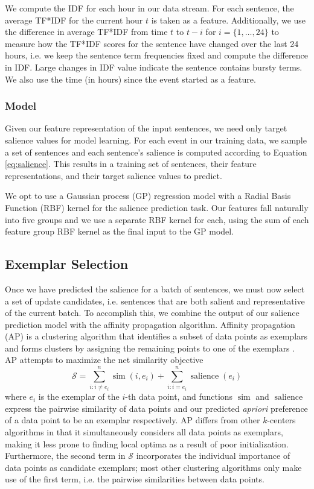 We compute the IDF for each hour in our data stream. For each sentence, the 
average TF*IDF for the current hour $t$ is taken as a feature. Additionally, 
we use the difference in average TF*IDF from time $t$ to $t-i$ for 
$i = \{1, \ldots, 24\}$ to measure how the TF*IDF scores for the sentence have
changed over the last 24 hours, i.e. we keep the sentence term frequencies 
fixed and compute the difference in IDF. Large changes in IDF value indicate 
the sentence contains bursty terms.
We also use the time (in hours) since the event started as a feature.


\subsubsection{Model}


Given our feature representation of the input sentences, we need only target 
salience values for model learning. For each event in our training data, we 
sample a set of sentences and  each sentence's salience is computed according 
to Equation \ref{eq:salience}. This results in a training set of sentences, 
their feature representations, and their target salience values to predict.


We opt to use a Gaussian process (GP) regression model
\cite{rasmussen:gaussian-process-book} with a Radial Basis Function (RBF) 
kernel for the salience prediction task. Our features fall naturally into 
five groups and we use a separate RBF kernel for each, using the sum of each 
feature group RBF kernel as the final input to the GP model.


\subsection{Exemplar Selection}
\label{sec:exsel}


Once we have predicted the salience for a batch of sentences, we must
now select a set of update candidates, i.e. sentences that are both salient
and representative of the current batch. To accomplish this, we combine the 
output of our salience prediction model with the affinity propagation 
algorithm.
Affinity propagation (AP) is a clustering algorithm
that identifies a subset of data points as exemplars and forms clusters
by assigning the remaining points to one of the exemplars 
\cite{frey2007clustering}. AP attempts to maximize the net similarity 
objective 
\[ \mathcal{S} = \sum_{i : i \neq e_i}^n \operatorname{sim}(i,e_i) 
+ \sum_{i : i = e_i}^n \operatorname{salience}(e_i)  \]
where $e_i$ is the exemplar of the $i$-th data point, and functions
$\operatorname{sim}$ and $\operatorname{salience}$ express the pairwise 
similarity of data points and our predicted \textit{apriori} preference of a 
data point to be an exemplar respectively. 
AP differs from other $k$-centers algorithms in that it simultaneously 
considers all data points as exemplars, making it less prone to finding local 
optima as a result of poor initialization. Furthermore, the second term in 
$\mathcal{S}$ incorporates the individual importance of data points as 
candidate exemplars; most other clustering algorithms only make use of the 
first term, i.e. the pairwise similarities between data points.
 

